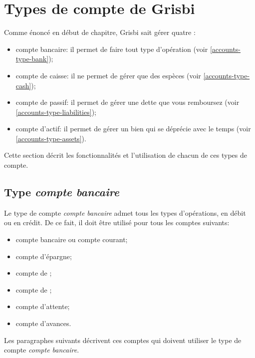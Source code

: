 \section{Types de compte de Grisbi\label{accounts-type}}

Comme énoncé en début de chapitre, Grisbi sait gérer quatre :

\begin{itemize}
	\item compte bancaire: il permet de faire tout type d'opération (voir \vref{accounts-type-bank});
	\item compte de caisse: il ne permet de gérer que des espèces (voir \vref{accounts-type-cash});
	\item compte de passif: il permet de gérer une dette que vous remboursez (voir \vref{accounts-type-liabilities}); 
	\item compte d'actif: il permet de gérer un bien qui se déprécie avec le temps (voir \vref{accounts-type-assets}).
\end{itemize}

Cette section décrit les fonctionnalités et l'utilisation de chacun de ces types de compte.


\subsection{Type \emph{compte bancaire}\label{accounts-type-bank}}

Le type de compte \emph{compte bancaire} admet tous les types d'opérations, en débit ou en crédit. De ce fait, il doit être utilisé pour tous les comptes suivants:
\begin{itemize}
	\item compte bancaire ou compte courant;
	\item compte d'épargne;
	\item compte de	;
	\item compte de ;		
	\item compte d'attente;
	\item compte d'avances. 
\end{itemize}

Les paragraphes suivants décrivent ces comptes qui doivent utiliser le type de compte \emph{compte bancaire}.


